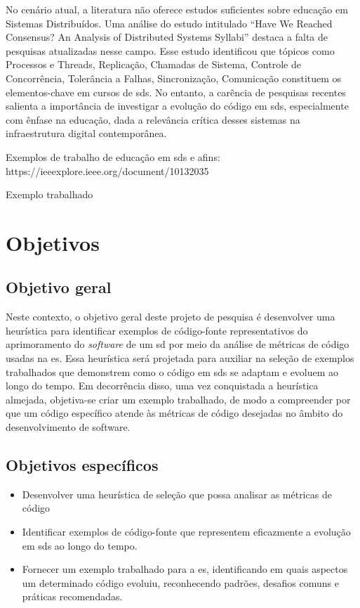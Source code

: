 No cenário atual, a literatura não oferece estudos suficientes sobre educação em Sistemas Distribuídos. Uma análise do estudo intitulado ``Have We Reached Consensus? An Analysis of Distributed Systems Syllabi'' \cite{HaveWeReachedConsensus} destaca a falta de pesquisas atualizadas nesse campo. Esse estudo identificou que tópicos como Processos e Threads, Replicação, Chamadas de Sistema, Controle de Concorrência, Tolerância a Falhas, Sincronização, Comunicação constituem os elementos-chave em cursos de \gls{sds}. No entanto, a carência de pesquisas recentes salienta a importância de investigar a evolução do código em \gls{sds}, especialmente com ênfase na educação, dada a relevância crítica desses sistemas na infraestrutura digital contemporânea.

Exemplos de trabalho de educação em \gls{sds} e afins: https://ieeexplore.ieee.org/document/10132035

Exemplo trabalhado

\section{Objetivos}\label{sec:objetivos}
\subsection{Objetivo geral}\label{subsec:objetivoGeral}
 Neste contexto, o objetivo geral deste projeto de pesquisa é desenvolver uma heurística para identificar exemplos de código-fonte representativos do aprimoramento do \textit{software} de um \gls{sd} por meio da análise de métricas de código usadas na \gls{es}. Essa heurística será projetada para auxiliar na seleção de exemplos trabalhados que demonstrem como o código em \gls{sds} se adaptam e evoluem ao longo do tempo. Em decorrência disso, uma vez conquistada a heurística almejada, objetiva-se criar um exemplo trabalhado, de modo a compreender por que um código específico atende às métricas de código desejadas no âmbito do desenvolvimento de software.

\subsection{Objetivos específicos}\label{subsec:objetivosEspecificos}
\begin{itemize}
    \item Desenvolver uma heurística de seleção que possa analisar as métricas de código
    \item Identificar exemplos de código-fonte que representem eficazmente a evolução em \gls{sds} ao longo do tempo.
    \item Fornecer um exemplo trabalhado para a \gls{es}, identificando em quais aspectos um determinado código evoluiu, reconhecendo padrões, desafios comuns e práticas recomendadas.
\end{itemize}

